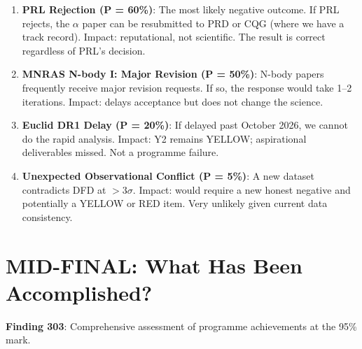 \documentclass[11pt,a4paper]{article}
\begin{document}
\begin{enumerate}
\item \textbf{PRL Rejection (P = 60\%)}: The most likely negative outcome. If PRL rejects, the $\alpha$ paper can be resubmitted to PRD or CQG (where we have a track record). Impact: reputational, not scientific. The result is correct regardless of PRL's decision.

\item \textbf{MNRAS N-body I: Major Revision (P = 50\%)}: N-body papers frequently receive major revision requests. If so, the response would take 1--2 iterations. Impact: delays acceptance but does not change the science.

\item \textbf{Euclid DR1 Delay (P = 20\%)}: If delayed past October 2026, we cannot do the rapid analysis. Impact: Y2 remains YELLOW; aspirational deliverables missed. Not a programme failure.

\item \textbf{Unexpected Observational Conflict (P = 5\%)}: A new dataset contradicts DFD at $> 3\sigma$. Impact: would require a new honest negative and potentially a YELLOW or RED item. Very unlikely given current data consistency.
\end{enumerate}

\section{MID-FINAL: What Has Been Accomplished?}

\textbf{Finding 303}: Comprehensive assessment of programme achievements at the 95\% mark.
\end{document}
